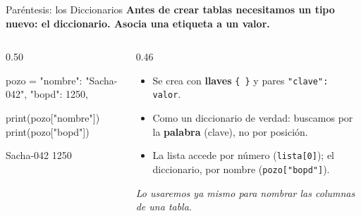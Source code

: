 \documentclass[aspectratio=169, 11pt]{beamer}
\begin{document}
\begin{frame}[fragile,shrink=20]{Paréntesis: los Diccionarios}
  \vspace{-4pt}
  {\small\color{arcaDark}\bfseries
    Antes de crear tablas necesitamos un tipo nuevo: el diccionario. Asocia una \textbf{etiqueta} a un \textbf{valor}.}

  \vspace{6pt}
  \begin{columns}[T]
    \begin{column}{0.50\textwidth}
      \begin{pyblock}
pozo = {
    "nombre": "Sacha-042",
    "bopd": 1250,
}

print(pozo["nombre"])
print(pozo["bopd"])
      \end{pyblock}
      \vspace{2pt}
      \begin{outputblock}
Sacha-042
1250
      \end{outputblock}
    \end{column}

    \begin{column}{0.46\textwidth}
      {\scriptsize\color{textMuted}
      \begin{itemize}\setlength{\itemsep}{5pt}
        \item[{\color{arcaRed}\scriptsize\faArrowRight}]
          Se crea con \textbf{llaves} \texttt{\{ \}} y
          pares \texttt{"clave": valor}.
        \item[{\color{arcaRed}\scriptsize\faArrowRight}]
          Como un diccionario de verdad:
          buscamos por la \textbf{palabra} (clave),
          no por posición.
        \item[{\color{arcaRed}\scriptsize\faArrowRight}]
          La lista accede por número
          (\texttt{lista[0]}); el diccionario, por
          nombre (\texttt{pozo["bopd"]}).
      \end{itemize}
      }
      \vspace{4pt}
      {\scriptsize\color{arcaDark}\itshape
        Lo usaremos ya mismo para nombrar las
        columnas de una tabla.}
    \end{column}
  \end{columns}
\end{frame}
\end{document}
